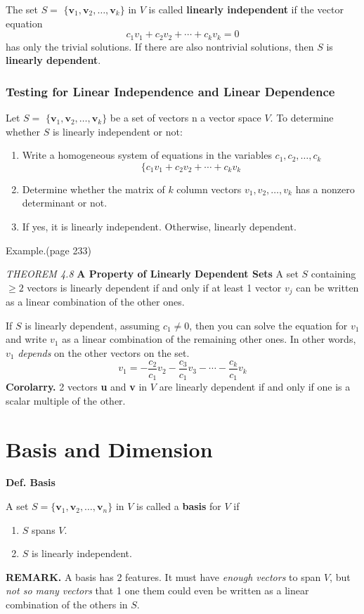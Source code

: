 \documentclass{article}
\newcommand\B{\textbf}
\newcommand\tcl{\begin{tcolorbox}[colback = {blue9}]}
\newcommand\etcl{\end{tcolorbox}}
\begin{document}
\begin{tcolorbox}
    \tcl
    The set $S = $ $\{\B{v}_1, \B{v}_2, \dots, \B{v}_k\}$  in $V$ is called \B{linearly independent} if the
    vector equation 
    \[  c_1v_1 + c_2v_2 + \cdots + c_kv_k  = 0 \]
    has only the trivial solutions. If there are also nontrivial solutions, then $S$ is \B{linearly
    dependent}.    
    \etcl 
    
    \subsubsection{Testing for Linear Independence and Linear Dependence}
    \tcl
        Let $S = $ $\{\B{v}_1, \B{v}_2, \dots, \B{v}_k\}$ be a set of vectors n a vector space $V$. To determine 
        whether $S$ is linearly independent or not:
        \begin{enumerate}
            \item Write a homogeneous system of equations in the variables $c_1, c_2, \dots, c_k$
                \[\{c_1v_1 + c_2v_2 + \cdots + c_kv_k \]
            \item Determine whether the matrix of $k$ column vectors $v_1, v_2, \dots, v_k$ has a nonzero determinant
                or not.
            \item If yes, it is linearly independent. Otherwise, linearly dependent.
        \end{enumerate}
    \etcl 
    Example.(page 233)

    \tcl
    \textit{THEOREM 4.8 } \quad \B{A Property of Linearly Dependent Sets}
    A set $S$ containing $\ge 2$ vectors is linearly dependent if and only if at least 1 vector $v_j$ can be
    written as a linear combination of the other ones.
    \etcl


    If $S$ is linearly dependent, assuming $c_1 \ne 0$, then you can solve the equation for  $v_1$ and write
    $v_1$ as a linear combination of the remaining other ones. In other words, $v_1$ \textit{depends} on the other
    vectors on the set.
    \[v_1 = -\frac{c_2}{c_1}v_2 - \frac{c_3}{c_1}v_3 - \cdots - \frac{c_k}{c_1}v_k\]
    \B{Corolarry.} 2 vectors \B{u} and \B{v} in $V$ are linearly dependent if and only if one is a
    scalar multiple of the other.
    
    \section{Basis and Dimension}

    \tcl
    \B{Def. Basis}
    
        A set $S = \{\B{v}_1, \B{v}_2, \dots, \B{v}_n\}$ in $V$ is called a \B{basis} for $V$ if
        \begin{enumerate}
            \item $S$ spans $V$.
            \item $S$ is linearly independent.
        \end{enumerate}
    \etcl 
    \B{REMARK. } A basis has 2 features. It must have \textit{enough vectors} to span $V$, but \textit{not
    so many vectors} that 1 one them could even be written as a linear combination of the
    others in $S$.


\end{tcolorbox}
\end{document}
